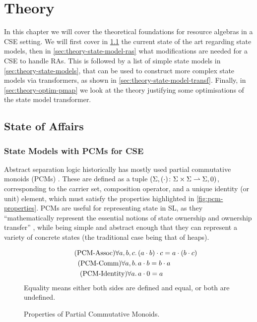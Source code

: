 \chapter{Theory} \label{chap:theory}

In this chapter we will cover the theoretical foundations for resource algebras in a CSE setting. We will first cover in \cref{sec:theory-state-of-affairs} the current state of the art regarding state models, then in \cref{sec:theory-state-model-ras} what modifications are needed for a CSE to handle RAs. This is followed by a list of simple state models in \cref{sec:theory-state-models}, that can be used to construct more complex state models via transformers, as shown in \cref{sec:theory-state-model-transf}. Finally, in \cref{sec:theory-optim-pmap} we look at the theory justifying some optimisations of the \PMap{} state model transformer.

\section{State of Affairs} \label{sec:theory-state-of-affairs}

\subsection{State Models with PCMs for CSE}

Abstract separation logic historically has mostly used partial commutative monoids (PCMs) \cite{abstractseplogic,sepalgebra,iris1,higherorderseplogic}. These are defined as a tuple ${(\Sigma, (\cdot)\colon \Sigma\times \Sigma\rightharpoonup \Sigma, 0)}$, corresponding to the carrier set, composition operator, and a unique identity (or unit) element, which must satisfy the properties highlighted in \autoref{fig:pcm-properties}. PCMs are useful for representing state in SL, as they ``mathematically represent the essential notions of state ownership and ownership transfer'' \cite{abstractpcm}, while being simple and abstract enough that they can represent a variety of concrete states (the traditional case being that of heaps).

\begin{figure}
	\centering
	\begin{align*}
	\tag{PCM-Assoc} \forall a,b,c&\ldotp (a\cdot b)\cdot c = a\cdot (b\cdot c)\\
	\tag{PCM-Comm} \forall a,b&\ldotp a\cdot b = b\cdot a\\
	\tag{PCM-Identity} \forall a&\ldotp a\cdot 0 = a
	\end{align*}
	Equality means either both sides are defined and equal, or both are undefined.
	\caption{Properties of Partial Commutative Monoids.}
	\label{fig:pcm-properties}
\end{figure}

